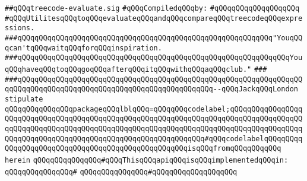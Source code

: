 \label{src/lib/compiler/back/low/treecode/treecode-eval.api}
\verb|##qQQqtreecode-evaluate.sig|\newline
\newline
\verb|#qQQqCompiledqQQqby:|\newline
\verb|#qQQqqQQqqQQqqQQqqQQq|\newline
\newline
\newline
\newline
\verb|#qQQqUtilitesqQQqtoqQQqevaluateqQQqandqQQqcompareqQQqtreecodeqQQqexpressions.|\newline
\newline
\newline
\newline
\verb|###qQQqqQQqqQQqqQQqqQQqqQQqqQQqqQQqqQQqqQQqqQQqqQQqqQQqqQQqqQQq"YouqQQqcan'tqQQqwaitqQQqforqQQqinspiration.|\newline
\verb|###qQQqqQQqqQQqqQQqqQQqqQQqqQQqqQQqqQQqqQQqqQQqqQQqqQQqqQQqqQQqqQQqYouqQQqhaveqQQqtoqQQqgoqQQqafterqQQqitqQQqwithqQQqaqQQqclub."|\newline
\verb|###|\newline
\verb|###qQQqqQQqqQQqqQQqqQQqqQQqqQQqqQQqqQQqqQQqqQQqqQQqqQQqqQQqqQQqqQQqqQQqqQQqqQQqqQQqqQQqqQQqqQQqqQQqqQQqqQQqqQQqqQQqqQQq--qQQqJackqQQqLondon|\newline
\newline
\newline
\newline
\verb|stipulate|\newline
\verb|qQQqqQQqqQQqqQQqpackageqQQqlblqQQq=qQQqqQQqcodelabel;qQQqqQQqqQQqqQQqqQQqqQQqqQQqqQQqqQQqqQQqqQQqqQQqqQQqqQQqqQQqqQQqqQQqqQQqqQQqqQQqqQQqqQQqqQQqqQQqqQQqqQQqqQQqqQQqqQQqqQQqqQQqqQQqqQQqqQQqqQQqqQQqqQQqqQQqqQQqqQQqqQQqqQQqqQQqqQQqqQQqqQQqqQQqqQQqqQQqqQQqqQQq#qQQqcodelabelqQQqqQQqqQQqqQQqqQQqqQQqqQQqqQQqqQQqqQQqqQQqqQQqqQQqisqQQqfromqQQqqQQqqQQq|\newline
\verb|herein|\newline
\newline
\verb|qQQqqQQqqQQqqQQq#qQQqThisqQQqapiqQQqisqQQqimplementedqQQqin:|\newline
\verb|qQQqqQQqqQQqqQQq#|\newline
\verb|qQQqqQQqqQQqqQQq#qQQqqQQqqQQqqQQqqQQq|\newline
